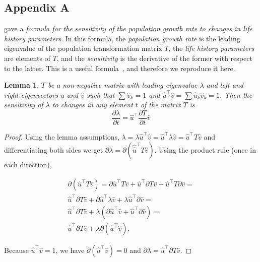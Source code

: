 \documentclass[9pt, a4paper, twocolumn]{extarticle}
\newcommand*{\tr}{^\intercal}
\newtheorem{lemma}{Lemma}
\begin{document}

\subsection*{Appendix A}\label{sec:AppA}

\citet{Caswell1978} gave a \emph{formula for the sensitivity of the population growth rate to changes in life history parameters}.
In this formula, the \emph{population growth rate} is the leading eigenvalue of the population transformation matrix $T$, the \emph{life history parameters} are elements of $T$, and the \emph{sensitivity} is the derivative of the former with respect to the latter.
This is a useful formula~\citep[ch.~10]{Caswell1978,Hermisson2002,Ram2012,Otto2007}, and therefore we reproduce it here.

\begin{lemma}
$T$ be a non-negative matrix with leading eigenvalue $\lambda$ and left and right eigenvectors $\hat u$ and $\hat v$ such that $\sum{\hat v_k}=1$ and $\hat u\tr \hat v = \sum{\hat u_k \hat v_k} = 1$.
Then the sensitivity of $\lambda$ to changes in any element $t$ of the matrix $T$ is
\begin{equation}\label{eq:Caswells_formula}
\frac{\partial \lambda}{\partial t} = 
\hat u\tr \frac{\partial T}{\partial t} \hat v
\end{equation}
\end{lemma}

\begin{proof} 
Using the lemma assumptions,
$\lambda = \lambda \hat u\tr \hat v = \hat u\tr \lambda \hat v = \hat u\tr T \hat v$ and differentiating both sides we get $\partial \lambda = \partial (\hat \hat u\tr T \hat v)$.
Using the product rule (once in each direction),

\begin{multline}
\partial (\hat u\tr T \hat v) = 
\partial \hat u\tr T \hat v + \hat u\tr \partial T \hat v + \hat u\tr T \partial \hat v = \\
\hat u\tr \partial T \hat v + \partial \hat u\tr \lambda \hat v  + \lambda \hat u\tr \partial \hat v = \\
\hat u\tr \partial T \hat v + \lambda(\partial \hat u\tr \hat v  + \hat u\tr \partial \hat v) = \\
\hat u\tr \partial T \hat v + \lambda \partial(\hat u\tr \hat v).
\end{multline}

Because $\hat u\tr \hat v = 1$,
we have $\partial (\hat u\tr \hat v) = 0$ and
$\partial \lambda = \hat u\tr \partial T \hat v$.
\end{proof}
\end{document}
